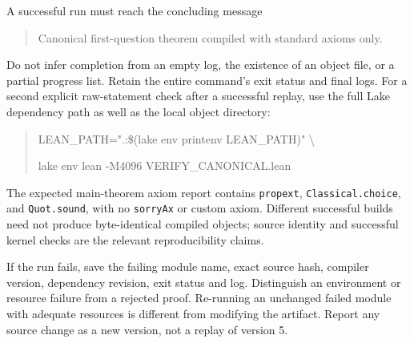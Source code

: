 \documentclass[10pt,letterpaper]{article}
\begin{document}
A successful run must reach the concluding message
\begin{quote}\small\ttfamily
Canonical first-question theorem compiled with standard axioms only.
\end{quote}
Do not infer completion from an empty log, the existence of an object file, or a partial progress list. Retain the entire command's exit status and final logs. For a second explicit raw-statement check after a successful replay, use the full Lake dependency path as well as the local object directory:
\begin{quote}\small\ttfamily
LEAN\_PATH=".:\$(lake env printenv LEAN\_PATH)" \textbackslash\par
\quad lake env lean -M4096 VERIFY\_CANONICAL.lean
\end{quote}
The expected main-theorem axiom report contains \texttt{propext}, \texttt{Classical.choice}, and \texttt{Quot.sound}, with no \texttt{sorryAx} or custom axiom. Different successful builds need not produce byte-identical compiled objects; source identity and successful kernel checks are the relevant reproducibility claims.

If the run fails, save the failing module name, exact source hash, compiler version, dependency revision, exit status and log. Distinguish an environment or resource failure from a rejected proof. Re-running an unchanged failed module with adequate resources is different from modifying the artifact. Report any source change as a new version, not a replay of version 5.
\end{document}
